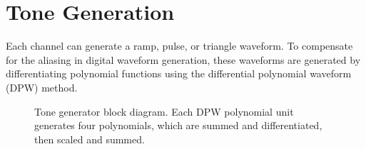 %
%
%
%
%
%
%
%

\section{Tone Generation}

Each channel can generate a ramp, pulse, or triangle waveform.  To compensate for the aliasing in digital waveform generation, these waveforms are generated by differentiating polynomial functions using the differential polynomial waveform (DPW) method\autocite{Valimaki2010}.

\begin{figure}[ht]
    \centering
    
    \caption{\label{fig:tone-generator-block-diagram}Tone generator block diagram.  Each DPW polynomial unit generates four polynomials, which are summed and differentiated, then scaled and summed.}
\end{figure}

